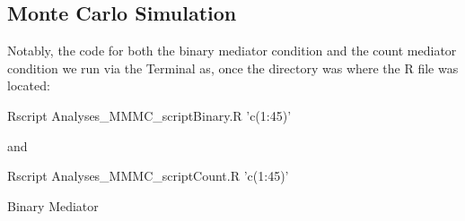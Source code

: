 \documentclass[]{DissertateCUNY}
\newenvironment{Shaded}{\begin{snugshade}}{\end{snugshade}}
\newcommand{\StringTok}[1]{\textcolor[rgb]{0.31,0.60,0.02}{#1}}
\newcommand{\ExtensionTok}[1]{#1}
\newcommand{\NormalTok}[1]{#1}
\begin{document}
\small

\normalsize

\clearpage

\subsection*{Monte Carlo Simulation}\label{monte-carlo-simulation}

Notably, the code for both the binary mediator condition and the count
mediator condition we run via the Terminal as, once the directory was
where the R file was located:

\small

\begin{Shaded}
\begin{Highlighting}[]
\ExtensionTok{Rscript}\NormalTok{ Analyses_MMMC_scriptBinary.R }\StringTok{'c(1:45)'}
\end{Highlighting}
\end{Shaded}

\normalsize

\noindent and

\small

\begin{Shaded}
\begin{Highlighting}[]
\ExtensionTok{Rscript}\NormalTok{ Analyses_MMMC_scriptCount.R }\StringTok{'c(1:45)'}
\end{Highlighting}
\end{Shaded}

\normalsize

Binary Mediator

\small
\end{document}
